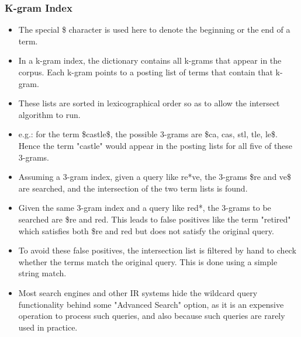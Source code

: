 \documentclass{article}
\begin{document}
\subsubsection{K-gram Index}
\label{kgram}
\begin{itemize}
    \item The special \$ character is used here to denote the beginning or the end of a term. 
    
    \item In a k-gram index, the dictionary contains all k-grams that appear in the corpus. Each k-gram points to a posting list of terms that contain that k-gram. 
    
    \item These lists are sorted in lexicographical order so as to allow the intersect algorithm to run.
    
    \item e.g.: for the term \$castle\$, the possible 3-grams are \$ca, cas, stl, tle, le\$. Hence the term "castle" would appear in the posting lists for all five of these 3-grams. 
    
    \item Assuming a 3-gram index, given a query like re*ve, the 3-grams \$re and ve\$ are searched, and the intersection of the two term lists is found. 
    
    \item Given the same 3-gram index and a query like red*, the 3-grams to be searched are \$re and red. This leads to false positives like the term "retired" which satisfies both \$re and red but does not satisfy the original query.
    
    \item To avoid these false positives, the intersection list is filtered by hand to check whether the terms match the original query. This is done using a simple string match. 
    
    \item Most search engines and other IR systems hide the wildcard query functionality behind some "Advanced Search" option, as it is an expensive operation to process such queries, and also because such queries are rarely used in practice. 
\end{itemize}
\end{document}
